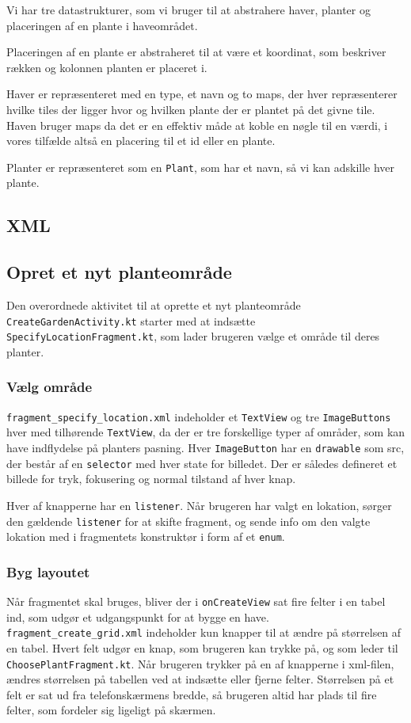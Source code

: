 Vi har tre datastrukturer, som vi bruger til at abstrahere haver, planter og placeringen af en plante i haveområdet.

Placeringen af en plante er abstraheret til at være et koordinat, som beskriver rækken og kolonnen planten er placeret i.

Haver er repræsenteret med en type, et navn og to maps, der hver repræsenterer hvilke tiles der ligger hvor og hvilken plante der er plantet på det givne tile.
Haven bruger maps da det er en effektiv måde at koble en nøgle til en værdi, i vores tilfælde altså en placering til et id eller en plante.

Planter er repræsenteret som en \texttt{Plant}, som har et navn, så vi kan adskille hver plante.

\subsection{XML}

\subsection{Opret et nyt planteområde}
Den overordnede aktivitet til at oprette et nyt planteområde \texttt{CreateGardenActivity.kt} starter med at indsætte \texttt{SpecifyLocationFragment.kt}, som lader brugeren vælge et område til deres planter.

\subsubsection{Vælg område}
\texttt{fragment\_specify\_location.xml} indeholder et \texttt{TextView} og tre \texttt{ImageButtons} hver med tilhørende \texttt{TextView}, da der er tre forskellige typer af områder, som kan have indflydelse på planters pasning. Hver \texttt{ImageButton} har en \texttt{drawable} som src, der består af en \texttt{selector} med hver state for billedet. Der er således defineret et billede for tryk, fokusering og normal tilstand af hver knap.

Hver af knapperne har en \texttt{listener}. Når brugeren har valgt en lokation, sørger den gældende \texttt{listener} for at skifte fragment, og sende info om den valgte lokation med i fragmentets konstruktør i form af et \texttt{enum}.

\subsubsection{Byg layoutet}
Når fragmentet skal bruges, bliver der i \texttt{onCreateView} sat fire felter i en tabel ind, som udgør et udgangspunkt for at bygge en have. \texttt{fragment\_create\_grid.xml} indeholder kun knapper til at ændre på størrelsen af en tabel. Hvert felt udgør en knap, som brugeren kan trykke på, og som leder til \texttt{ChoosePlantFragment.kt}. Når brugeren trykker på en af knapperne i xml-filen, ændres størrelsen på tabellen ved at indsætte eller fjerne felter. Størrelsen på et felt er sat ud fra telefonskærmens bredde, så brugeren altid har plads til fire felter, som fordeler sig ligeligt på skærmen. 

